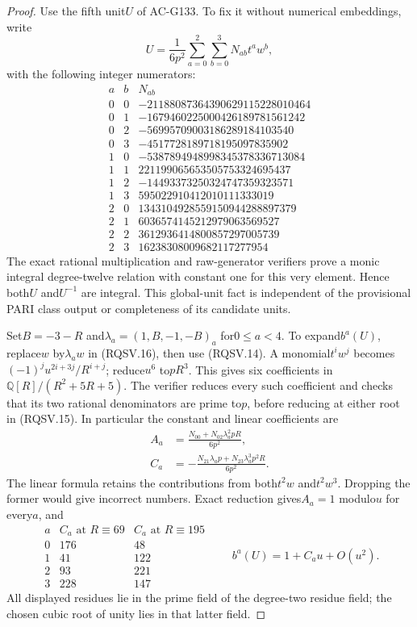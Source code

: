 \begin{proof}
Use the fifth unit$U$ of AC-G133.  To fix it without numerical
embeddings, write
\[
                U=\frac1{6p^2}
                    \sum_{a=0}^2\sum_{b=0}^3 N_{ab}t^a w^b,
 \tag{RQSV.16}
\]
with the following integer numerators:
\[
\begin{array}{cc|r}
a&b&N_{ab}\\ \hline
0&0&-21188087364390629115228010464\\
0&1&-1679460225000426189781561242\\
0&2&-56995709003186289184103540\\
0&3&-4517728189718195097835902\\
1&0&-5387894948998345378336713084\\
1&1&221199065653505753324695437\\
1&2&-14493373250324747359323571\\
1&3&595022910412010111333019\\
2&0&1343104928559150944288897379\\
2&1&6036574145212979063569527\\
2&2&3612936414800857297005739\\
2&3&16238308009682117277954
\end{array}
 \tag{RQSV.17}
\]
The exact rational multiplication and raw-generator verifiers
prove a monic integral degree-twelve relation with constant one
for this very element.  Hence both$U$ and$U^{-1}$ are integral.
This global-unit fact is independent of the provisional PARI
class output or completeness of its candidate units.

Set$B=-3-R$ and$\lambda_a=(1,B,-1,-B)_a$ for$0\le a<4$.
To expand$b^a(U)$, replace$w$ by$\lambda_a w$ in (RQSV.16),
then use (RQSV.14).  A monomial$t^i w^j$ becomes
$(-1)^j u^{2i+3j}/R^{i+j}$; reduce$u^6$ to$pR^3$.
This gives six coefficients in$\mathbb Q[R]/(R^2+5R+5)$.
The verifier reduces every such coefficient and checks that its
two rational denominators are prime to$p$, before reducing at
either root in (RQSV.15).
In particular the constant and linear coefficients are
\[
 \begin{split}
 A_a&=\frac{N_{00}+N_{02}\lambda_a^2pR}{6p^2},\\
 C_a&=-\frac{N_{21}\lambda_ap+N_{23}\lambda_a^3p^2R}{6p^2}.
 \end{split}
 \tag{RQSV.18}
\]
The linear formula retains the contributions from both$t^2w$
and$t^2w^3$.  Dropping the former would give incorrect numbers.
Exact reduction gives$A_a=1$ modulo$u$ for every$a$, and
\[
 \begin{array}{c|cc}
 a&C_a\text{ at }R\equiv69&C_a\text{ at }R\equiv195\\ \hline
 0&176&48\\
 1&41&122\\
 2&93&221\\
 3&228&147
 \end{array}
 \qquad b^a(U)=1+C_a u+O(u^2).
 \tag{RQSV.19}
\]
All displayed residues lie in the prime field of the degree-two
residue field; the chosen cubic root of unity lies in that latter
field.


\end{proof}
